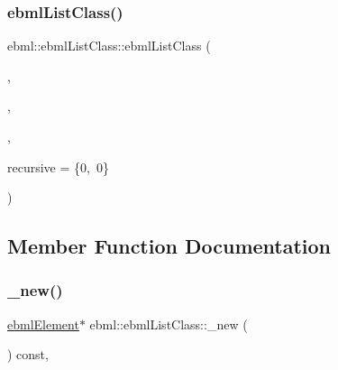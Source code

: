 \mbox{\label{classebml_1_1ebmlListClass_a36f6bdc1d175392d0560058f450e1e94}} 
\subsubsection{\texorpdfstring{ebml\+List\+Class()}{ebmlListClass()}\hspace{0.1cm}{\footnotesize\ttfamily [6/6]}}
{\footnotesize\ttfamily ebml\+::ebml\+List\+Class\+::ebml\+List\+Class (\begin{DoxyParamCaption}\item[{\mbox{\hyperlink{namespaceebml_a86c5f604ddf12a74aa9812e997a58691}{ebml\+I\+D\+\_\+t}}}]{,  }\item[{std\+::wstring}]{,  }\item[{\mbox{\hyperlink{namespaceebml_a40cf7ad4b58caaa8c07da3ed83f7a431}{child\+Class\+Spec\+Arg\+\_\+init\+\_\+l}}}]{,  }\item[{const \mbox{\hyperlink{structebml_1_1occurSpec__t}{occur\+Spec\+\_\+t}} \&}]{recursive = {\ttfamily \{0,~0\}} }\end{DoxyParamCaption})}



\subsection{Member Function Documentation}
\mbox{\label{classebml_1_1ebmlListClass_aef729ee70f218de1013c3782c481bffb}} 
\subsubsection{\texorpdfstring{\+\_\+new()}{\_new()}}
{\footnotesize\ttfamily \mbox{\hyperlink{classebml_1_1ebmlElement}{ebml\+Element}}$\ast$ ebml\+::ebml\+List\+Class\+::\+\_\+new (\begin{DoxyParamCaption}{ }\end{DoxyParamCaption}) const\hspace{0.3cm}{\ttfamily [protected]}, {\ttfamily [virtual]}}



